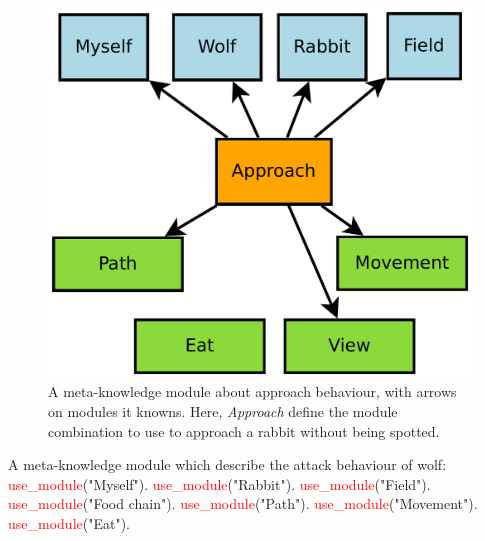 \documentclass{aamas2012}
\begin{document}
	\begin{figure}
		\centering
		\includegraphics[keepaspectratio=true, scale=0.3]{approach_behaviour.pdf}
		\caption
		{
			\label{approach_figure}
			A meta-knowledge module about approach behaviour, with arrows on modules it knowns.
			Here, \emph{Approach} define the module combination to use to approach a rabbit without being spotted.
		}
	\end{figure}
	
	\begin{example}
		\label{approach_example}
		A meta-knowledge module which describe the attack behaviour of wolf:\newline
		\newline
		\textcolor{red}{use\_module}("Myself").\newline
		\textcolor{red}{use\_module}("Rabbit").\newline
		\textcolor{red}{use\_module}("Field").\newline
		\textcolor{red}{use\_module}("Food chain").\newline
		\textcolor{red}{use\_module}("Path").\newline
		\textcolor{red}{use\_module}("Movement").\newline
		\textcolor{red}{use\_module}("Eat").
	\end{example}
	
\end{document}
